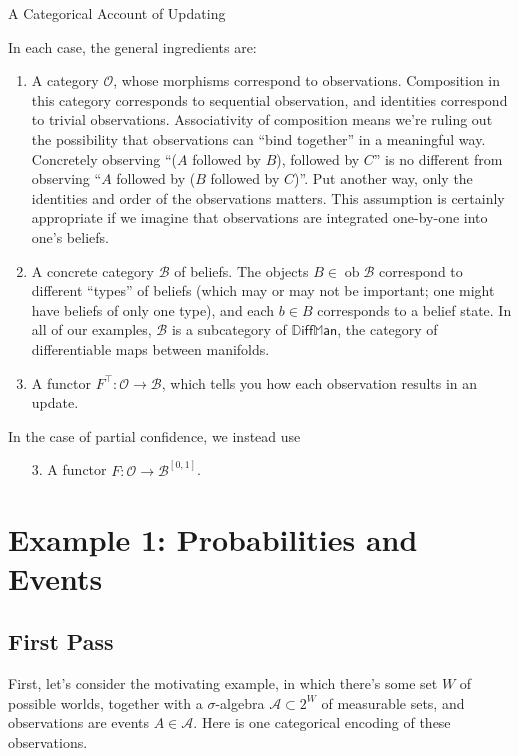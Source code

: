 \documentclass{article}
\DeclareMathOperator{\ob}{\mathrm{ob}}
\newcommand\B{\mathcal{B}}
\newcommand\Ob{\mathcal{O}}
\newcommand\DiffMan{\mathbb{D}\mathsf{iff}\mathbb{M}\mathsf{an}}
\begin{document}
    \begin{center}
        \Huge
        A Categorical Account of Updating
        \bigskip
    \end{center}
    
    In each case, the general ingredients are:
    \begin{enumerate}
        \item A category $\Ob$, whose morphisms correspond to observations.
        Composition in this category corresponds to sequential observation, and identities correspond to trivial observations.
        Associativity of composition means we're ruling out the possibility that observations can ``bind together'' in a meaningful way.
        Concretely observing ``($A$ followed by $B$), followed by $C$'' is no different from observing ``$A$ followed by ($B$ followed by $C$)''. 
        Put another way, only the identities and order of the observations matters. 
        This assumption is certainly appropriate if we imagine that observations are integrated one-by-one into one's beliefs.
         
        \item A concrete category $\B$ of beliefs.
        The objects $B \in \ob \B$ correspond to different ``types'' of beliefs (which may or may not be important; one might have beliefs of only one type),
        and each $b \in B$ corresponds to a belief state. 
        In all of our examples, $\B$ is a subcategory of $\DiffMan$, the category of differentiable maps between manifolds. 
        
        \item A functor $F^\top : \Ob \to \B$, which tells you how each observation results in an update. 
        
    \end{enumerate}
    In the case of partial confidence, we instead use
    \begin{enumerate}
        \item[3.] A functor $F : \mathcal O \to \mathcal B^{[0,1]}$. 
    \end{enumerate}
    
    
    \section{Example 1: Probabilities and Events}
    
    \subsection{First Pass}
    First, let's consider the motivating example, in which there's some set $W$ of possible worlds, together with a $\sigma$-algebra $\mathcal A \subset 2^W$ of measurable sets, and observations are events $A \in \mathcal A$. 
    Here is one categorical encoding of these observations. 
    
\end{document}
